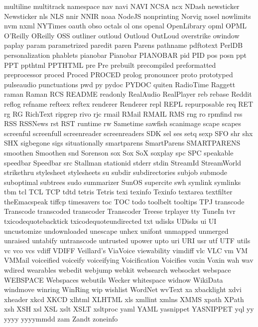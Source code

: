multiline
multitrack
namespace
nav
navi
NAVI
NCSA
ncx
NDash
newsticker
Newsticker
nls
NLS
nnir
NNIR
noaa
NodeJS
nonprinting
Norvig
nosel
nowlimits
nvm
nxml
NYTimes
oauth
obso
octals
ol
ons
openal
OpenLibrary
opml
OPML
O'Reilly
OReilly
OSS
outliner
outloud
Outloud
OutLoud
overstrike
owindow
paplay
param
parametrized
paredit
paren
Parens
pathname
pdftotext
PerlDB
personalization
phablets
pianobar
Pianobar
PIANOBAR
pid
PID
pos
posn
ppt
PPT
ppthtml
PPTHTML
pre
Pre
prebuilt
precompiled
preformatted
preprocessor
proced
Proced
PROCED
prolog
pronouncer
proto
prototyped
pulseaudio
punctuations
pwd
py
pydoc
PYDOC
quiten
RadioTime
Raggett
raman
Raman
RCS
README
readonly
RealAudio
RealPlayer
reb
rebase
Reddit
reflog
refname
refteex
reftex
renderer
Renderer
repl
REPL
repurposable
req
RET
rg
RG
RichText
ripgrep
rivo
rjc
rmail
RMail
RMAIL
RMS
rng
ro
rpmfind
rss
RSS
RSSNews
rst
RST
runtime
rw
Sametime
sawfish
scanimage
scape
scapes
screenful
screenfull
screenreader
screenreaders
SDK
sel
ses
setq
sexp
SFO
shr
shx
SHX
sigbegone
sigs
situationally
smartparens
SmartParens
SMARTPARENS
smoothen
Smoothen
snd
Sorenson
sox
Sox
SoX
soxplay
spc
SPC
speakable
speedbar
Speedbar
src
Stallman
stationid
stderr
stdin
StreamId
StreamWorld
strikethru
stylesheet
stylesheets
su
subdir
subdirectories
subjob
submode
suboptimal
subtrees
sudo
summarizer
SunOS
supercite
swh
symlink
symlinks
tbm
tcl
TCL
TCP
tdtd
tetris
Tetris
texi
texinfo
Texinfo
textarea
textfilter
theEmacspeak
tiffcp
timesavers
toc
TOC
todo
toolbelt
tooltips
TPJ
transcode
Transcode
transcoded
transcoder
Transcoder
Treese
trplayer
tty
TuneIn
tvr
txicodequotebacktick
txicodequoteundirected
txt
udisks
UDisks
ui
UI
uncustomize
undownloaded
unescape
unhex
unifont
unmapped
unmerged
unraised
untabify
untranscode
untrusted
upower
upto
uri
URI
usr
utf
UTF
utils
vc
vco
vcs
vdiff
VDIFF
Veillard's
ViaVoice
viewability
vimdiff
vlc
VLC
vm
VM
VMMail
voiceified
voiceify
voiceifying
Voicification
Voicifies
voxin
Voxin
wah
wav
wdired
wearables
webedit
webjump
webkit
websearch
websocket
webspace
WEBSPACE
Webspaces
webutils
Wecker
whitespace
widnow
WikiData
windmove
winring
WinRing
wip
wishlist
WordNet
wvText
xa
xbacklight
xdvi
xheader
xkcd
XKCD
xlhtml
XLHTML
xls
xmllint
xmlns
XMMS
xpath
XPath
xsh
XSH
xsl
XSL
xslt
XSLT
xsltproc
yaml
YAML
yasnippet
YASNIPPET
yql
yy
yyyy
yyyymmdd
zam
Zandt
zoneinfo

